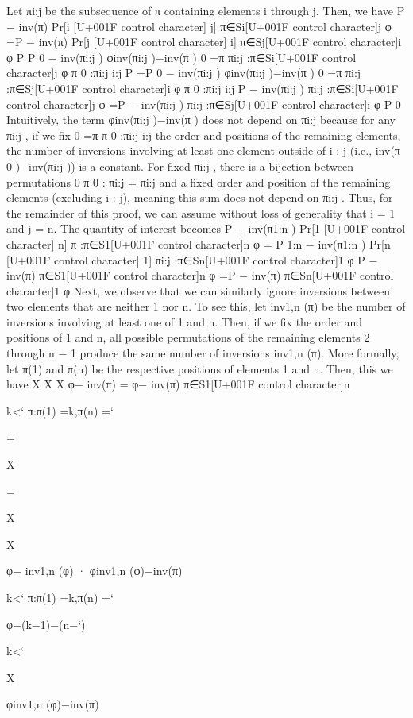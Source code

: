 \documentclass[10pt]{article}
\begin{document}
\begin{ReviewVerbatim}
Let πi:j be the subsequence of π containing elements i through j. Then, we have
P
− inv(π)
Pr[i [U+001F control character] j]
π∈Si[U+001F control character]j φ
=P
− inv(π)
Pr[j [U+001F control character] i]
π∈Sj[U+001F control character]i φ
P
P
0
− inv(πi:j )
φinv(πi:j )−inv(π )
0 =π
πi:j :π∈Si[U+001F control character]j φ
π 0 :πi:j
i:j
P
=P
0
− inv(πi:j )
φinv(πi:j )−inv(π )
0 =π
πi:j :π∈Sj[U+001F control character]i φ
π 0 :πi:j
i:j
P
− inv(πi:j )
πi:j :π∈Si[U+001F control character]j φ
=P
− inv(πi:j )
πi:j :π∈Sj[U+001F control character]i φ
P
0
Intuitively, the term
φinv(πi:j )−inv(π ) does not depend on πi:j because for any πi:j , if we fix
0 =π
π 0 :πi:j
i:j
the order and positions of the remaining elements, the number of inversions involving at least one element
outside of i : j (i.e., inv(π 0 )−inv(πi:j )) is a constant. For fixed πi:j , there is a bijection between permutations
0
π 0 : πi:j
= πi:j and a fixed order and position of the remaining elements (excluding i : j), meaning this sum
does not depend on πi:j . Thus, for the remainder of this proof, we can assume without loss of generality
that i = 1 and j = n. The quantity of interest becomes
P
− inv(π1:n )
Pr[1 [U+001F control character] n]
π :π∈S1[U+001F control character]n φ
= P 1:n
− inv(π1:n )
Pr[n [U+001F control character] 1]
πi:j :π∈Sn[U+001F control character]1 φ
P
− inv(π)
π∈S1[U+001F control character]n φ
=P
− inv(π)
π∈Sn[U+001F control character]1 φ
Next, we observe that we can similarly ignore inversions between two elements that are neither 1 nor n.
To see this, let inv1,n (π) be the number of inversions involving at least one of 1 and n. Then, if we fix the
order and positions of 1 and n, all possible permutations of the remaining elements 2 through n − 1 produce
the same number of inversions inv1,n (π). More formally, let π(1) and π(n) be the respective positions of
elements 1 and n. Then, this we have
X
X
X
φ− inv(π) =
φ− inv(π)
π∈S1[U+001F control character]n

k<` π:π(1) =k,π(n) =`

=

X

=

X

X

φ− inv1,n (φ) · φinv1,n (φ)−inv(π)

k<` π:π(1) =k,π(n) =`

φ−(k−1)−(n−`)

k<`

X

φinv1,n (φ)−inv(π)


\end{ReviewVerbatim}
\end{document}
